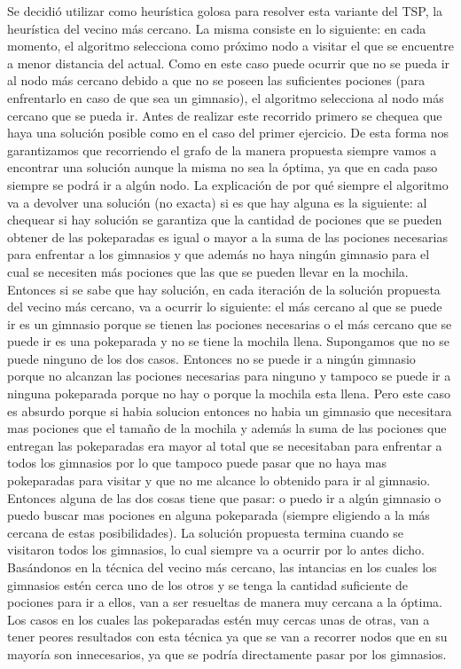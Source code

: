         Se decidió utilizar como heurística golosa para resolver esta variante del TSP, la heurística del vecino más cercano. La misma consiste en lo siguiente: en cada momento, el algoritmo selecciona como próximo nodo a visitar el que se encuentre a menor distancia del actual. Como en este caso puede ocurrir que no se pueda ir al nodo más cercano debido a que no se poseen las suficientes pociones (para enfrentarlo en caso de que sea un gimnasio), el algoritmo selecciona al nodo más cercano que se pueda ir. Antes de realizar este recorrido primero se chequea que haya una solución posible como en el caso del primer ejercicio. De esta forma nos garantizamos que recorriendo el grafo de la manera propuesta siempre vamos a encontrar una solución aunque la misma no sea la óptima, ya que en cada paso siempre se podrá ir a algún nodo. La explicación de por qué siempre el algoritmo va a devolver una solución (no exacta) si es que hay alguna es la siguiente: al chequear si hay solución se garantiza que la cantidad de pociones que se pueden obtener de las pokeparadas es igual o mayor a la suma de las pociones necesarias para enfrentar a los gimnasios y que además no haya ningún gimnasio para el cual se necesiten más pociones que las que se pueden llevar en la mochila. Entonces si se sabe que hay solución, en cada iteración de la solución propuesta del vecino más cercano, va a ocurrir lo siguiente: el más cercano al que se puede ir es un gimnasio porque se tienen las pociones necesarias o el más cercano que se puede ir es una pokeparada y no se tiene la mochila llena. Supongamos que no se puede ninguno de los dos casos. Entonces no se puede ir a ningún gimnasio porque no alcanzan las pociones necesarias para ninguno y tampoco se puede ir a ninguna pokeparada porque no hay o porque la mochila esta llena. Pero este caso es absurdo porque si habia solucion entonces no habia un gimnasio que necesitara mas pociones que el tamaño de la mochila y además la suma de las pociones que entregan las pokeparadas era mayor al total que se necesitaban para enfrentar a todos los gimnasios por lo que tampoco puede pasar que no haya mas pokeparadas para visitar y que no me alcance lo obtenido para ir al gimnasio. Entonces alguna de las dos cosas tiene que pasar: o puedo ir a algún gimnasio o puedo buscar mas pociones en alguna pokeparada (siempre eligiendo a la más cercana de estas posibilidades). La solución propuesta termina cuando se visitaron todos los gimnasios, lo cual siempre va a ocurrir por lo antes dicho. 
        Basándonos en la técnica del vecino más cercano, las intancias en los cuales los gimnasios estén cerca uno de los otros y se tenga la cantidad suficiente de pociones para ir a ellos, van a ser resueltas de manera muy cercana a la óptima. Los casos en los cuales las pokeparadas estén muy cercas unas de otras, van a tener peores resultados con esta técnica ya que se van a recorrer nodos que en su mayoría son innecesarios, ya que se podría directamente pasar por los gimnasios.

